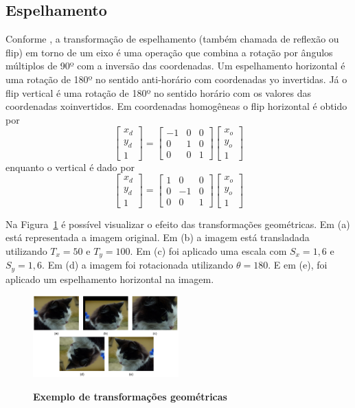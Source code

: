 \documentclass[12pt,oneside,a4paper,english,french,spanish,brazil,]{abntex2}
\begin{document}
\subsection{Espelhamento}

Conforme \citet{conci:2003}, a transformação de espelhamento (também chamada de reflexão ou flip) em torno de um eixo é uma operação que combina a rotação por ângulos múltiplos de 90º com a inversão das coordenadas. Um espelhamento horizontal é uma rotação de 180º no sentido anti-horário com coordenadas yo invertidas. Já o flip vertical é uma rotação de 180º no sentido horário com os valores das coordenadas xoinvertidos.
	Em coordenadas homogêneas o flip horizontal é obtido por
\[
\begin{bmatrix}
x_d\\ 
y_d\\ 
1
\end{bmatrix}
=
\begin{bmatrix}
-1 & 0 & 0\\ 
0 & 1 & 0\\ 
0 & 0 & 1
\end{bmatrix}
\begin{bmatrix}
x_o\\ 
y_o\\ 
1
\end{bmatrix}
\]
enquanto o vertical é dado por
\[
\begin{bmatrix}
x_d\\ 
y_d\\ 
1
\end{bmatrix}
=
\begin{bmatrix}
1 & 0 & 0\\ 
0 & -1 & 0\\ 
0 & 0 & 1
\end{bmatrix}
\begin{bmatrix}
x_o\\ 
y_o\\ 
1
\end{bmatrix}
\]

Na Figura~\ref{fig:PDI_Transformacoes_Geometricas} é possível visualizar o efeito das transformações geométricas. Em (a) está representada a imagem original. Em (b) a imagem está transladada utilizando \(T_x=50\) e \(T_y=100\). Em (c) foi aplicado uma escala com \(S_x=1,6\) e \(S_y=1,6\). Em (d) a imagem foi rotacionada utilizando \(\theta=180\). E em (e), foi aplicado um espelhamento horizontal na imagem.

\begin{figure}[ht]
\centering
\caption{\textbf{Exemplo de transformações geométricas}}
\includegraphics[width=0.5\textwidth]{imagens/PDI_Transformacoes_Geometricas.pdf}
\sourceAuthor
\label{fig:PDI_Transformacoes_Geometricas}
\end{figure}
\end{document}

